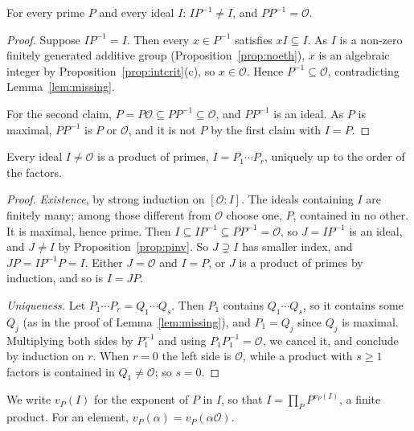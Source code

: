 \begin{proposition}\label{prop:pinv}
For every prime $P$ and every ideal $I$: $IP^{-1}\ne I$, and $PP^{-1}=\mathcal O$.
\end{proposition}
\begin{proof}
Suppose $IP^{-1}=I$. Then every $x\in P^{-1}$ satisfies $xI\subseteq I$. As $I$ is a non-zero finitely generated additive
group (Proposition~\ref{prop:noeth}), $x$ is an algebraic integer by Proposition~\ref{prop:intcrit}(c), so $x\in\mathcal
O$. Hence $P^{-1}\subseteq\mathcal O$, contradicting Lemma~\ref{lem:missing}.

For the second claim, $P=P\mathcal O\subseteq PP^{-1}\subseteq\mathcal O$, and $PP^{-1}$ is an ideal. As $P$ is maximal,
$PP^{-1}$ is $P$ or $\mathcal O$, and it is not $P$ by the first claim with $I=P$.
\end{proof}

\begin{theorem}[Dedekind]\label{thm:ufi}
Every ideal $I\ne\mathcal O$ is a product of primes, $I=P_1\cdots P_r$, uniquely up to the order of the factors.
\end{theorem}
\begin{proof}
\emph{Existence}, by strong induction on $[\mathcal O:I]$. The ideals containing $I$ are finitely many; among those
different from $\mathcal O$ choose one, $P$, contained in no other. It is maximal, hence prime. Then
$I\subseteq IP^{-1}\subseteq PP^{-1}=\mathcal O$, so $J=IP^{-1}$ is an ideal, and $J\ne I$ by
Proposition~\ref{prop:pinv}. So $J\supsetneq I$ has smaller index, and $JP=IP^{-1}P=I$. Either $J=\mathcal O$ and $I=P$, or $J$ is a product of primes by induction, and so is $I=JP$.

\emph{Uniqueness.} Let $P_1\cdots P_r=Q_1\cdots Q_s$. Then $P_1$ contains $Q_1\cdots Q_s$, so it contains some $Q_j$ (as
in the proof of Lemma~\ref{lem:missing}), and $P_1=Q_j$ since $Q_j$ is maximal. Multiplying both sides by $P_1^{-1}$
and using $P_1P_1^{-1}=\mathcal O$, we cancel it, and conclude by induction on $r$. When $r=0$ the left side is
$\mathcal O$, while a product with $s\ge1$ factors is contained in $Q_1\ne\mathcal O$; so $s=0$.
\end{proof}

We write $v_P(I)$ for the exponent of $P$ in $I$, so that $I=\prod_PP^{v_P(I)}$, a finite product. For an element,
$v_P(\alpha)=v_P(\alpha\mathcal O)$.


